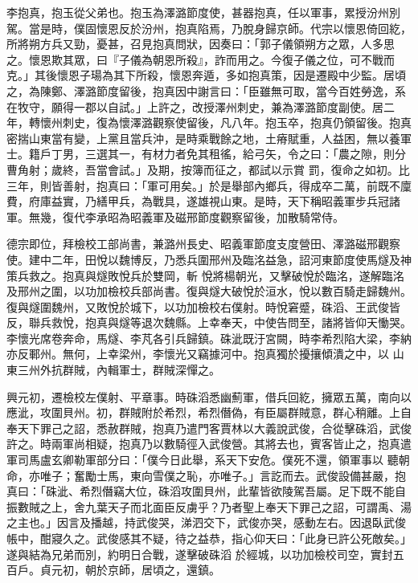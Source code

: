 \begin{pinyinscope}
 李抱真，抱玉從父弟也。抱玉為澤潞節度使，甚器抱真，任以軍事，累授汾州別駕。當是時，僕固懷恩反於汾州，抱真陷焉，乃脫身歸京師。代宗以懷恩倚回紇，所將朔方兵又勁，憂甚，召見抱真問狀，因奏曰：「郭子儀領朔方之眾，人多思之。懷恩欺其眾，曰『子儀為朝恩所殺』，詐而用之。今復子儀之位，可不戰而克。」其後懷恩子瑒為其下所殺，懷恩奔遁，多如抱真策，因是遷殿中少監。居頃
 之，為陳鄭、澤潞節度留後，抱真因中謝言曰：「臣雖無可取，當今百姓勞逸，系在牧守，願得一郡以自試。」上許之，改授澤州刺史，兼為澤潞節度副使。居二年，轉懷州刺史，復為懷澤潞觀察使留後，凡八年。抱玉卒，抱真仍領留後。抱真密揣山東當有變，上黨且當兵沖，是時乘戰餘之地，土瘠賦重，人益困，無以養軍士。籍戶丁男，三選其一，有材力者免其租徭，給弓矢，令之曰：「農之隙，則分曹角射；歲終，吾當會試。」及期，按簿而征之，都試以示賞
 罰，復命之如初。比三年，則皆善射，抱真曰：「軍可用矣。」於是舉部內鄉兵，得成卒二萬，前既不廩費，府庫益實，乃繕甲兵，為戰具，遂雄視山東。是時，天下稱昭義軍步兵冠諸軍。無幾，復代李承昭為昭義軍及磁邢節度觀察留後，加散騎常侍。



 德宗即位，拜檢校工部尚書，兼潞州長史、昭義軍節度支度營田、澤潞磁邢觀察使。建中二年，田悅以魏博反，乃悉兵圍邢州及臨洺益急，詔河東節度使馬燧及神策兵救之。抱真與燧敗悅兵於雙岡，斬
 悅將楊朝光，又擊破悅於臨洺，遂解臨洺及邢州之圍，以功加檢校兵部尚書。復與燧大破悅於洹水，悅以數百騎走歸魏州。復與燧圍魏州，又敗悅於城下，以功加檢校右僕射。時悅窘蹙，硃滔、王武俊皆反，聯兵救悅，抱真與燧等退次魏縣。上幸奉天，中使告問至，諸將皆仰天慟哭。李懷光席卷奔命，馬燧、李芃各引兵歸鎮。硃泚既汙宮闕，時李希烈陷大梁，李納亦反鄆州。無何，上幸梁州，李懷光又竊據河中。抱真獨於擾攘傾潰之中，以
 山東三州外抗群賊，內輯軍士，群賊深憚之。



 興元初，遷檢校左僕射、平章事。時硃滔悉幽薊軍，借兵回紇，擁眾五萬，南向以應泚，攻圍貝州。初，群賊附於希烈，希烈僭偽，有臣屬群賊意，群心稍離。上自奉天下罪己之詔，悉赦群賊，抱真乃遣門客賈林以大義說武俊，合從擊硃滔，武俊許之。時兩軍尚相疑，抱真乃以數騎徑入武俊營。其將去也，賓客皆止之，抱真遣軍司馬盧玄卿勒軍部分曰：「僕今日此舉，系天下安危。僕死不還，領軍事以
 聽朝命，亦唯子；奮勵士馬，東向雪僕之恥，亦唯子。」言訖而去。武俊設備甚嚴，抱真曰：「硃泚、希烈僭竊大位，硃滔攻圍貝州，此輩皆欲陵駕吾屬。足下既不能自振數賊之上，舍九葉天子而北面臣反虜乎？乃者聖上奉天下罪己之詔，可謂禹、湯之主也。」因言及播越，持武俊哭，涕泗交下，武俊亦哭，感動左右。因退臥武俊帳中，酣寢久之。武俊感其不疑，待之益恭，指心仰天曰：「此身已許公死敵矣。」遂與結為兄弟而別，約明日合戰，遂擊破硃滔
 於經城，以功加檢校司空，實封五百戶。貞元初，朝於京師，居頃之，還鎮。




\end{pinyinscope}
